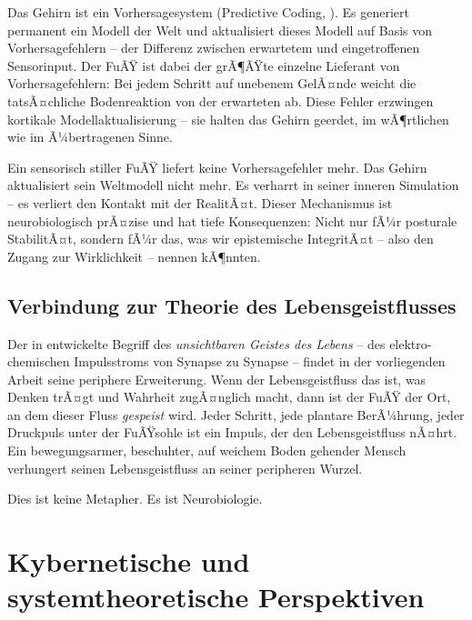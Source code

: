 ﻿\documentclass[12pt,a4paper]{report}
\theoremstyle{plain}
\theoremstyle{definition}
\theoremstyle{remark}
\begin{document}
Das Gehirn ist ein Vorhersagesystem (Predictive Coding,
\cite{friston2010}). Es generiert permanent ein Modell der Welt
und aktualisiert dieses Modell auf Basis von Vorhersagefehlern --
der Differenz zwischen erwartetem und eingetroffenen Sensorinput.
Der FuÃŸ ist dabei der grÃ¶ÃŸte einzelne Lieferant von
Vorhersagefehlern: Bei jedem Schritt auf unebenem GelÃ¤nde
weicht die tatsÃ¤chliche Bodenreaktion von der erwarteten ab.
Diese Fehler erzwingen kortikale Modellaktualisierung --
sie halten das Gehirn geerdet, im wÃ¶rtlichen wie im Ã¼bertragenen
Sinne.

Ein sensorisch stiller FuÃŸ liefert keine Vorhersagefehler mehr.
Das Gehirn aktualisiert sein Weltmodell nicht mehr. Es verharrt
in seiner inneren Simulation -- es verliert den Kontakt mit der
RealitÃ¤t. Dieser Mechanismus ist neurobiologisch prÃ¤zise
und hat tiefe Konsequenzen: Nicht nur fÃ¼r posturale StabilitÃ¤t,
sondern fÃ¼r das, was wir epistemische IntegritÃ¤t -- also den
Zugang zur Wirklichkeit -- nennen kÃ¶nnten.

\subsection{Verbindung zur Theorie des Lebensgeistflusses}

Der in \cite{epp2026brn} entwickelte Begriff des
\emph{unsichtbaren Geistes des Lebens} -- des elektro-chemischen
Impulsstroms von Synapse zu Synapse -- findet in der vorliegenden
Arbeit seine periphere Erweiterung. Wenn der Lebensgeistfluss das
ist, was Denken trÃ¤gt und Wahrheit zugÃ¤nglich macht, dann ist der
FuÃŸ der Ort, an dem dieser Fluss \emph{gespeist} wird. Jeder
Schritt, jede plantare BerÃ¼hrung, jeder Druckpuls unter der
FuÃŸsohle ist ein Impuls, der den Lebensgeistfluss nÃ¤hrt. Ein
bewegungsarmer, beschuhter, auf weichem Boden gehender Mensch
verhungert seinen Lebensgeistfluss an seiner peripheren Wurzel.

Dies ist keine Metapher. Es ist Neurobiologie.

\section{Kybernetische und systemtheoretische Perspektiven}
\end{document}
